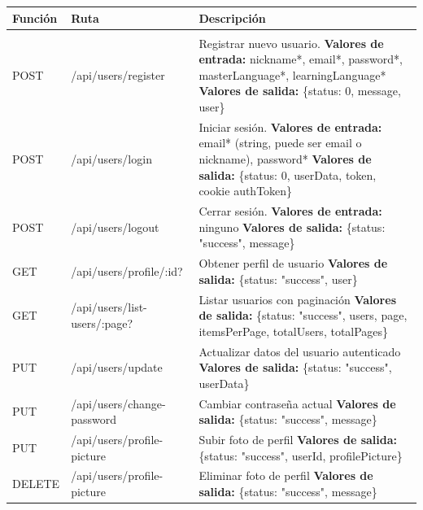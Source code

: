 \begin{longtable}{|l|p{5cm}|p{8cm}|}
\hline
\textbf{Función} & \textbf{Ruta} & \textbf{Descripción} \\
\hline
\endhead
\hline
\endfoot
\multicolumn{3}{|c|}{\textbf{User Routes}} \\
\hline
POST & /api/users/register & Registrar nuevo usuario. \newline \textbf{Valores de entrada:} nickname*, email*, password*, master\-Language*, learning\-Language* \newline \textbf{Valores de salida:} \{status: 0, message, user\} \\
POST & /api/users/login & Iniciar sesión. \newline \textbf{Valores de entrada:} email* (string, puede ser email o nickname), password* \newline \textbf{Valores de salida:} \{status: 0, userData, token, cookie authToken\} \\
POST & /api/users/logout & Cerrar sesión. \newline \textbf{Valores de entrada:} ninguno \newline \textbf{Valores de salida:} \{status: "success", message\} \\
GET & /api/users/profile/:id? & Obtener perfil de usuario \newline \textbf{Valores de salida:} \{status: "success", user\} \\
GET & /api/users/list-users/:page? & Listar usuarios con paginación \newline \textbf{Valores de salida:} \{status: "success", users, page, itemsPerPage, totalUsers, totalPages\} \\
PUT & /api/users/update & Actualizar datos del usuario autenticado \newline \textbf{Valores de salida:} \{status: "success", userData\} \\
PUT & /api/users/change-password & Cambiar contraseña actual \newline \textbf{Valores de salida:} \{status: "success", message\} \\
PUT & /api/users/profile-picture & Subir foto de perfil \newline \textbf{Valores de salida:} \{status: "success", userId, profilePicture\} \\
DELETE & /api/users/profile-picture & Eliminar foto de perfil \newline \textbf{Valores de salida:} \{status: "success", message\} \\

\end{longtable}
